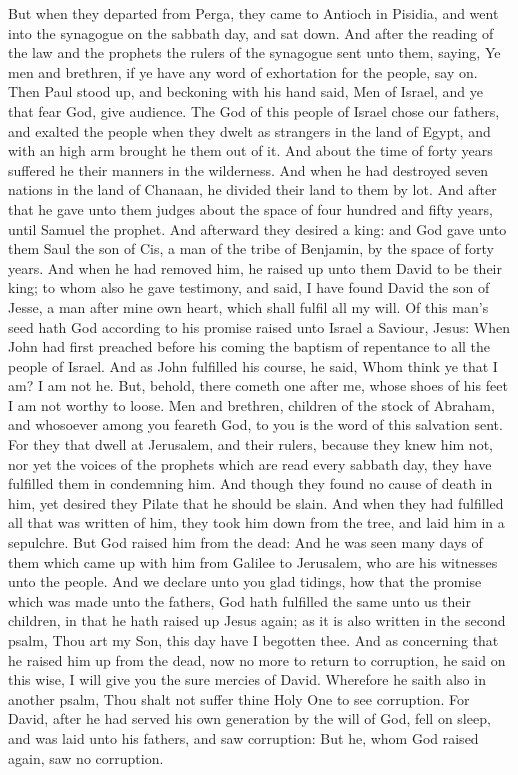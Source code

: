  But when they departed from Perga, they came to Antioch in
Pisidia, and went into the synagogue on the sabbath day, and sat down.
 And after the reading of the law and the prophets the
rulers of the synagogue sent unto them, saying, Ye men and brethren, if
ye have any word of exhortation for the people, say on. 
Then Paul stood up, and beckoning with his hand said, Men of Israel, and
ye that fear God, give audience.  The God of this people of
Israel chose our fathers, and exalted the people when they dwelt as
strangers in the land of Egypt, and with an high arm brought he them out
of it.  And about the time of forty years suffered he their
manners in the wilderness.  And when he had destroyed seven
nations in the land of Chanaan, he divided their land to them by lot.
 And after that he gave unto them judges about the space of
four hundred and fifty years, until Samuel the prophet. 
And afterward they desired a king: and God gave unto them Saul the son
of Cis, a man of the tribe of Benjamin, by the space of forty years.
 And when he had removed him, he raised up unto them David
to be their king; to whom also he gave testimony, and said, I have found
David the son of Jesse, a man after mine own heart, which shall fulfil
all my will.  Of this man's seed hath God according to his
promise raised unto Israel a Saviour, Jesus:  When John had
first preached before his coming the baptism of repentance to all the
people of Israel.  And as John fulfilled his course, he
said, Whom think ye that I am? I am not he. But, behold, there cometh
one after me, whose shoes of his feet I am not worthy to loose.
 Men and brethren, children of the stock of Abraham, and
whosoever among you feareth God, to you is the word of this salvation
sent.  For they that dwell at Jerusalem, and their rulers,
because they knew him not, nor yet the voices of the prophets which are
read every sabbath day, they have fulfilled them in condemning him.
 And though they found no cause of death in him, yet
desired they Pilate that he should be slain.  And when they
had fulfilled all that was written of him, they took him down from the
tree, and laid him in a sepulchre.  But God raised him from
the dead:  And he was seen many days of them which came up
with him from Galilee to Jerusalem, who are his witnesses unto the
people.  And we declare unto you glad tidings, how that the
promise which was made unto the fathers,  God hath
fulfilled the same unto us their children, in that he hath raised up
Jesus again; as it is also written in the second psalm, Thou art my Son,
this day have I begotten thee.  And as concerning that he
raised him up from the dead, now no more to return to corruption, he
said on this wise, I will give you the sure mercies of David.
 Wherefore he saith also in another psalm, Thou shalt not
suffer thine Holy One to see corruption.  For David, after
he had served his own generation by the will of God, fell on sleep, and
was laid unto his fathers, and saw corruption:  But he,
whom God raised again, saw no corruption.

